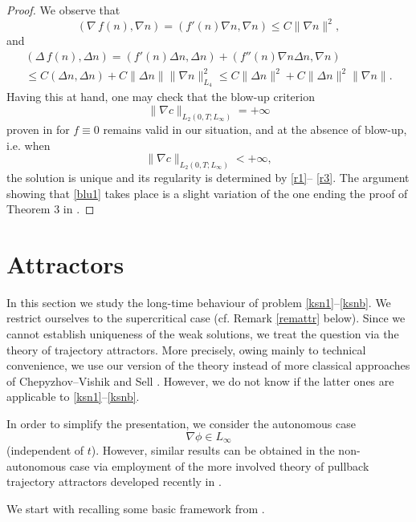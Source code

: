 \documentclass[10pt]{amsart}
\begin{document}
\begin{proof} We observe that \begin{equation} (\nabla\, f(n), \nabla n)=(f'(n) \nabla n, \nabla n)\leq C\|\nabla n\|^2, \end{equation} and \begin{multline} (\Delta \,f(n), \Delta n)= (f'(n)\Delta n, \Delta n) + (f''(n) \nabla n \Delta n, \nabla n) \\ \leq  C(\Delta n, \Delta n) + C\|\Delta n\|\|\nabla n\|_{L_4}^2\leq C\|\Delta n\|^2+C \|\Delta n\|^2\|\nabla n\|. \end{multline} Having this at hand, one may check that the blow-up criterion \begin{equation}\label{blu}\|\nabla c\|_{L_{2}(0, T; L_\infty)}=+\infty\end{equation} proven in \cite{ckl11} for $f\equiv 0$ remains valid in our situation, and at the absence of blow-up, i.e. when \begin{equation}\label{blu1}\|\nabla c\|_{L_{2}(0, T; L_\infty)}<+\infty,\end{equation}  the solution is unique and its regularity is determined by \eqref{r1}-- \eqref{r3}. The argument showing that \eqref{blu1} takes place is a slight variation of the one ending the proof of Theorem 3 in \cite{ckl11}. 
\end{proof}

\section{Attractors} In this section we study the long-time behaviour of problem \eqref{ksn1}--\eqref{ksnb}. We restrict ourselves to the supercritical case (cf. Remark \ref{remattr} below). Since we cannot establish uniqueness of the weak solutions, we treat the question via the theory of trajectory attractors. More precisely, owing mainly to technical convenience, we use our version of the theory \cite[Chapter 4]{book} instead of more classical approaches of Chepyzhov--Vishik \cite{cvb} and Sell \cite{sell}. However, we do not know if the latter ones are applicable to \eqref{ksn1}--\eqref{ksnb}. 

In order to simplify the presentation, we consider the autonomous case $$\nabla \phi \in L_\infty$$ (independent of $t$). 
However, similar results can be obtained in the non-autonomous case via employment of the more involved theory of pullback trajectory attractors developed recently in \cite{jde11}. 

We start with recalling some basic framework from \cite[Chapter 4]{book}. 
\end{document}
